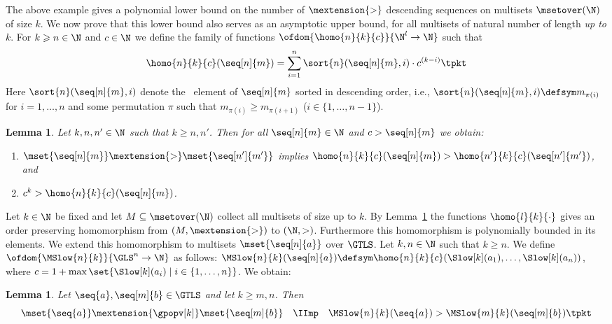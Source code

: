 \documentclass{LMCS}
\newtheorem{lemma}[thm]{Lemma}
\begin{document}
The above example gives a polynomial lower bound on the number of $\mextension{>}$ descending 
sequences on multisets $\msetover(\N)$ of size $k$.
We now prove that this lower bound also serves as an asymptotic upper bound, 
for all multisets of natural number of length \emph{up to} $k$. 
For $k\geqslant n \in \N$ and $c \in \N$ we define the family of functions $\ofdom{\homo{n}{k}{c}}{\N^l \to \N}$ 
such that 
\begin{align*}
  \homo{n}{k}{c}(\seq[n]{m}) = \sum_{i=1}^n \sort{n}(\seq[n]{m},i) \cdot c^{(k - i)} \tpkt
\end{align*}
Here $\sort{n}(\seq[n]{m},i)$ denote the \ element of $\seq[n]{m}$ sorted in descending order, i.e., 
$\sort{n}(\seq[n]{m},i) \defsym m_{\pi(i)}$ 
for $i =1,\dots,n$ and some permutation $\pi$ such that $m_{\pi(i)} \geqslant m_{\pi(i+1)}$ ($i \in \{1,\dots,n-1\}$).
\begin{lemma}\label{l:homo}
  Let $k,n,n' \in \N$ such that $k \geqslant n,n'$. Then
  for all $\seq[n]{m} \in \N$ and $c > \seq[n]{m}$ we obtain:
  \begin{enumerate}[labelsep=*,leftmargin=*]
\item\label{l:homo:5} 
    $\mset{\seq[n]{m}} \mextension{>} \mset{\seq[n']{m'}}$ implies $\homo{n}{k}{c}(\seq[n]{m}) > \homo{n'}{k}{c}(\seq[n']{m'})$, and
  \item\label{l:homo:4} 
    $c^{k} > \homo{n}{k}{c}(\seq[n]{m})$.
  \end{enumerate}
\end{lemma}

Let $k \in \N$ be fixed and let $M \subseteq \msetover(\N)$ collect all multisets of size up to $k$.
By Lemma~\ref{l:homo} the functions $\homo{l}{k}{\cdot}$ 
gives an order preserving homomorphism from $(M,\mextension{>})$ to $(\N,>)$.
Furthermore this homomorphism is polynomially bounded in its elements.
We extend this homomorphism to multisets $\mset{\seq[n]{a}}$ over $\GTLS$.
Let $k,n \in \N$ such that $k \geqslant n$.
  We define $\ofdom{\MSlow{n}{k}}{\GLS^n \to \N}$ as follows:
  $
  \MSlow{n}{k}(\seq[n]{a}) \defsym \homo{n}{k}{c}(\Slow[k](a_1),\dots,\Slow[k](a_n))
  $,
  where $c = 1 + \max \set{\Slow[k](a_i) \mid i \in \{1,\dots,n\}}$.
We obtain:
\begin{lemma}\label{l:slowpoly}
  Let $\seq{a},\seq[m]{b}\in \GTLS$ and let $k \geqslant m,n$. Then
  $$
  \mset{\seq{a}} \mextension{\gpopv[k]} \mset{\seq[m]{b}} 
  \quad \IImp \quad \MSlow{n}{k}(\seq{a}) > \MSlow{m}{k}(\seq[m]{b}) \tpkt
  $$
\end{lemma}
\end{document}
